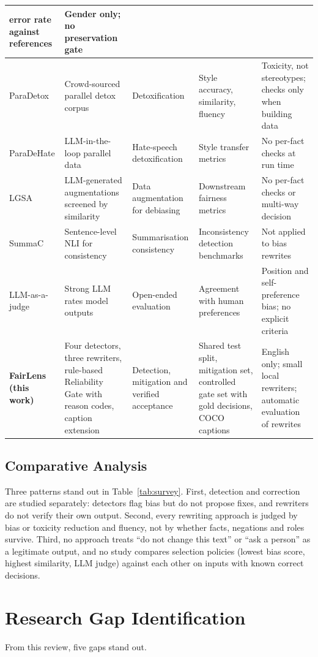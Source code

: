 \documentclass[12pt,a4paper,oneside]{report}
\begin{document}
\begin{longtable}{|L{2.6cm}|L{3.2cm}|L{2.4cm}|L{2.8cm}|L{3.2cm}|}
error rate against references & Gender only; no preservation gate\\ \hline
ParaDetox \cite{paradetox} & Crowd-sourced parallel detox corpus & Detoxification & Style accuracy, similarity, fluency
& Toxicity, not stereotypes; checks only when building data\\ \hline
ParaDeHate \cite{paradehate} & LLM-in-the-loop parallel data & Hate-speech detoxification & Style transfer metrics &
No per-fact checks at run time\\ \hline
LGSA \cite{lgsa} & LLM-generated augmentations screened by similarity & Data augmentation for debiasing & Downstream
fairness metrics & No per-fact checks or multi-way decision\\ \hline
SummaC \cite{summac} & Sentence-level NLI for consistency & Summarisation consistency & Inconsistency detection
benchmarks & Not applied to bias rewrites\\ \hline
LLM-as-a-judge \cite{mtbench} & Strong LLM rates model outputs & Open-ended evaluation & Agreement with human
preferences & Position and self-preference bias; no explicit criteria\\ \hline
\textbf{FairLens (this work)} & Four detectors, three rewriters, rule-based Reliability Gate with reason codes,
caption extension & Detection, mitigation and verified acceptance & Shared test split, mitigation set, controlled gate set
with gold decisions, COCO captions & English only; small local rewriters; automatic evaluation of rewrites\\ \hline
\end{longtable}

\subsection{Comparative Analysis}
Three patterns stand out in Table~\ref{tab:survey}. First, detection and correction are studied separately: detectors
flag bias but do not propose fixes, and rewriters do not verify their own output. Second, every rewriting approach is
judged by bias or toxicity reduction and fluency, not by whether facts, negations and roles survive. Third, no approach
treats ``do not change this text'' or ``ask a person'' as a legitimate output, and no study compares selection policies
(lowest bias score, highest similarity, LLM judge) against each other on inputs with known correct decisions.

\section{Research Gap Identification}
From this review, five gaps stand out.
\end{document}
